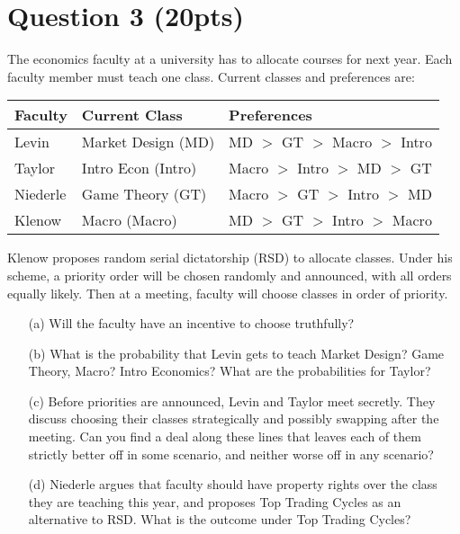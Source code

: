 \documentclass[10pt,a4paper]{article}
\begin{document}
\section*{Question 3 (20pts)}
  The economics faculty at a university has to allocate courses for next year. Each faculty member must teach one class. Current classes and preferences are:
  
  \begin{center}
    \begin{tabular}{|l|l|l|}
      \hline
      \textbf{Faculty} & \textbf{Current Class} & \textbf{Preferences} \\
      \hline
      Levin & Market Design (MD) & MD $>$ GT $>$ Macro $>$ Intro \\
      \hline
      Taylor & Intro Econ (Intro) & Macro $>$ Intro $>$ MD $>$ GT \\
      \hline
      Niederle & Game Theory (GT) & Macro $>$ GT $>$ Intro $>$ MD \\
      \hline
      Klenow & Macro (Macro) & MD $>$ GT $>$ Intro $>$ Macro \\
      \hline
    \end{tabular}
  \end{center}

  Klenow proposes random serial dictatorship (RSD) to allocate classes. Under his scheme, a priority order will be chosen randomly and announced, with all orders equally likely. Then at a meeting, faculty will choose classes in order of priority.

  \begin{enumerate}
      \item[(a)] Will the faculty have an incentive to choose truthfully?
      \item[(b)] What is the probability that Levin gets to teach Market Design? Game Theory, Macro? Intro Economics? What are the probabilities for Taylor?
      \item[(c)] Before priorities are announced, Levin and Taylor meet secretly. They discuss choosing their classes strategically and possibly swapping after the meeting. Can you find a deal along these lines that leaves each of them strictly better off in some scenario, and neither worse off in any scenario?
      \item[(d)] Niederle argues that faculty should have property rights over the class they are teaching this year, and proposes Top Trading Cycles as an alternative to RSD. What is the outcome under Top Trading Cycles?
  \end{enumerate}
\end{document}
